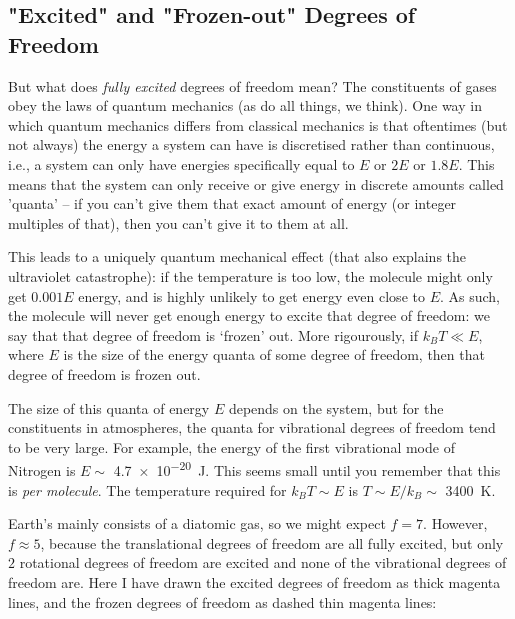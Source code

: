 \subsection{"Excited" and "Frozen-out" Degrees of Freedom}

But what does \textit{fully excited} degrees of freedom mean? The constituents of gases obey the laws of quantum mechanics (as do all things, we think). One way in which quantum mechanics differs from classical mechanics is that oftentimes (but not always) the energy a system can have is discretised rather than continuous, i.e., a system can only have energies specifically equal to $E$ or $2E$ or $1.8E$. This means that the system can only receive or give energy in discrete amounts called 'quanta' – if you can't give them that exact amount of energy (or integer multiples of that), then you can't give it to them at all. 

This leads to a uniquely quantum mechanical effect (that also explains the ultraviolet catastrophe): if the temperature is too low, the molecule might only get $0.001E$ energy, and is highly unlikely to get energy even close to $E$. As such, the molecule will never get enough energy to excite that degree of freedom: we say that that degree of freedom is `frozen' out. More rigourously, if $k_BT\ll E$, where $E$ is the size of the energy quanta of some degree of freedom, then that degree of freedom is frozen out. 

The size of this quanta of energy $E$ depends on the system, but for the constituents in atmospheres, the quanta for vibrational degrees of freedom tend to be very large. For example, the energy of the first vibrational mode of Nitrogen is $E\sim$ \qty{4.7e-20}{\joule}. This seems small until you remember that this is \textit{per molecule}. The temperature required for $k_BT\sim E$ is $T\sim E/k_B\sim$ \qty{3400}{\kelvin}.

Earth's mainly consists of a diatomic gas, so we might expect $f=7$. However, $f\approx5$, because the translational degrees of freedom are all fully excited, but only $2$ rotational degrees of freedom are excited and none of the vibrational degrees of freedom are. Here I have drawn the excited degrees of freedom as thick magenta lines, and the frozen degrees of freedom as dashed thin magenta lines:\newline


